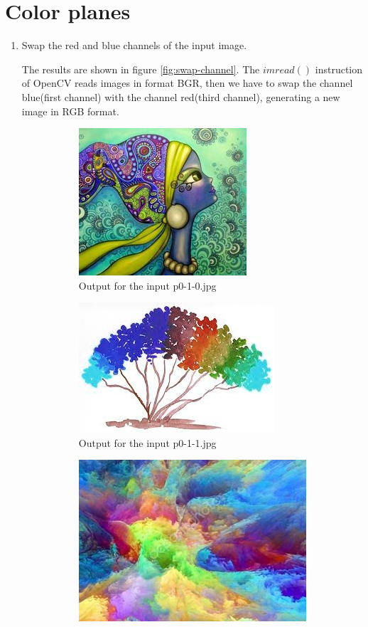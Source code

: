 \section{Color planes}
\begin{enumerate}[label=\emph{\alph*)}]
\item Swap the red and blue channels of the input image.

The results are shown in figure \ref{fig:swap-channel}. The $imread()$ instruction of OpenCV reads images in format BGR, then we have to swap the channel blue(first channel) with the channel red(third channel), generating a new image in RGB format.

\begin{figure}[h!]
\centering
\begin{subfigure}{0.5\textwidth}
  \centering
  \includegraphics[width=0.5\linewidth]{../output/p0-2-a-0.jpg}
  \caption{Output for the input p0-1-0.jpg}
  \label{fig:sfig1}
\end{subfigure}%
\begin{subfigure}{0.5\textwidth}
  \centering
  \includegraphics[width=0.5\linewidth]{../output/p0-2-a-1.jpg}
  \caption{Output for the input p0-1-1.jpg}
  \label{fig:sfig2}
\end{subfigure}
\begin{subfigure}{0.5\textwidth}
  \centering
  \includegraphics[width=0.5\linewidth]{../output/p0-2-a-2.jpg}

\end{subfigure}
\end{figure}
\end{enumerate}
